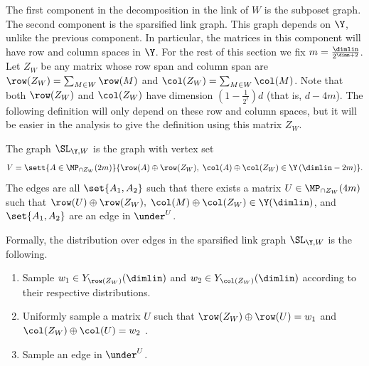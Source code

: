The first component in the decomposition in the link of \(W\) is the subposet graph.
%
The second component is the sparsified link graph. This graph depends on \(\Y\), unlike the previous component. In particular, the matrices in this component will have row and column spaces in \(\Y\). For the rest of this section we fix \(m = \frac{\dimlin}{2^{\dimm+2}}\). Let \(Z_W\) be any matrix whose row span and column span are \(\row(Z_W) = \sum_{M \in W}\row(M)\) and \(\col(Z_W) = \sum_{M \in W}\col(M)\). Note that both $\row(Z_W)$ and $\col(Z_W)$ have dimension $(1-\frac{1}{2^{\ell}})d$ (that is, $d-4m$). The following definition will only depend on these row and column spaces, but it will be easier in the analysis to give the definition using this matrix \(Z_W\).
\begin{definition} \label{def:sparsified-link-graph}
   The graph \(\SL_{\Y,W}\) is the graph with vertex set
    \[ V = \sett{A\in \MP_{\cap Z_W}(2m)}{\row(A) \oplus \row(Z_W), \; \col(A) \oplus \col(Z_W)  \in \Y\left(\dimlin-2m \right)}.\]
    The edges are all \(\set{A_1,A_2}\) such that there exists a matrix \(U \in \MP_{\cap Z_W}(4m)\) such that \(\row(U) \oplus \row(Z_W), \; \col(M) \oplus \col(Z_W) \in \Y(\dimlin)\), and \(\set{A_1, A_2}\) are an edge in \(\under^U\).
%
\end{definition}
Formally, the distribution over edges in the sparsified link graph \(\SL_{\Y,W}\) is the following. %
\begin{enumerate}
    \item Sample \(w_1 \in Y_{\row(Z_W)}(\dimlin)\) and \(w_2 \in Y_{\col(Z_W)}(\dimlin)\) according to their respective distributions.
    \item Uniformly sample a matrix \(U\) such that \(\row(Z_W) \oplus \row(U) = w_1\) and \(\col(Z_W) \oplus \col(U) = w_2\) .
    \item Sample an edge in \(\under^U\).
\end{enumerate}
%

